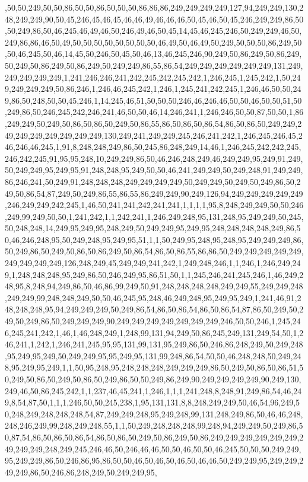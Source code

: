,50,50,249,50,50,86,50,50,86,50,50,50,86,86,86,249,249,249,249,127,94,249,249,130,248,249,249,90,50,45,246,45,46,45,46,46,49,46,46,46,50,45,46,50,45,246,249,249,86,50,50,249,86,50,46,245,46,49,46,50,246,49,46,50,45,14,45,46,245,246,50,249,249,46,50,249,86,86,46,50,49,50,50,50,50,50,50,50,50,46,49,50,46,49,50,249,50,50,50,86,249,50,50,46,245,50,46,14,45,50,246,50,45,50,46,13,46,245,246,90,249,50,86,249,50,86,249,50,249,50,86,249,50,86,249,50,249,249,86,55,86,54,249,249,249,249,249,249,131,249,249,249,249,249,1,241,246,246,241,242,245,242,245,242,1,246,245,1,245,242,1,50,249,249,249,249,50,86,246,1,246,46,245,242,1,246,1,245,241,242,245,1,246,46,50,50,249,86,50,248,50,50,45,246,1,14,245,46,51,50,50,50,246,46,246,46,50,50,46,50,50,51,50,249,86,50,246,245,242,246,241,46,50,50,46,14,246,241,1,246,246,50,50,87,50,50,1,86,249,249,50,249,50,86,50,86,50,249,50,86,55,86,50,86,50,86,54,86,50,86,50,249,249,249,249,249,249,249,249,249,130,249,241,249,249,245,246,241,242,1,246,245,246,45,246,246,46,245,1,91,8,248,248,249,86,50,245,86,248,249,14,46,1,246,245,242,242,245,246,242,245,91,95,95,248,10,249,249,86,50,46,246,248,249,46,249,249,95,249,91,249,50,249,249,95,249,95,91,248,248,95,249,50,50,46,241,249,249,50,249,248,91,249,249,86,246,241,50,249,91,248,248,248,249,249,249,249,50,249,249,50,249,50,249,86,50,249,50,86,54,87,249,50,249,86,55,86,55,86,249,249,90,249,126,94,249,249,249,249,249,246,249,249,242,245,1,46,50,241,241,242,241,241,1,1,1,1,95,8,248,249,249,50,50,246,249,99,249,50,50,1,241,242,1,1,242,241,1,246,249,248,95,131,248,95,249,249,50,245,50,248,248,14,249,95,249,95,248,249,50,249,249,95,249,95,248,248,248,248,249,86,50,46,246,248,95,50,249,248,95,249,95,51,1,1,50,249,95,248,95,248,95,249,249,249,86,50,249,86,50,249,50,86,50,86,249,50,86,54,86,50,86,55,86,86,50,249,249,249,249,249,249,249,249,249,126,248,249,45,249,249,241,242,1,249,248,246,1,1,246,1,246,249,249,1,248,248,248,95,249,86,50,246,249,95,86,51,50,1,1,245,246,241,245,246,1,46,249,248,95,8,248,94,249,86,50,46,86,99,249,50,91,248,248,248,248,249,249,55,249,249,248,249,249,99,248,248,249,50,50,46,245,95,248,46,249,248,95,249,95,249,1,241,46,91,248,248,248,95,94,249,249,249,50,249,86,54,86,50,86,54,86,50,86,54,87,86,50,249,50,249,50,249,86,50,249,249,249,90,249,249,249,249,249,249,249,246,50,50,246,1,245,246,245,241,242,1,46,1,46,248,249,1,248,99,131,94,249,50,86,245,249,131,249,54,50,1,246,241,1,242,1,246,241,245,95,95,131,99,131,95,249,86,50,246,86,248,249,50,249,248,95,249,95,249,50,249,249,95,95,249,95,131,99,248,86,54,50,50,46,248,248,50,249,248,95,249,95,249,1,1,50,95,248,95,248,248,248,249,249,249,86,50,249,50,86,50,86,51,50,249,50,86,50,249,50,86,50,249,86,50,50,249,86,249,90,249,249,249,249,90,249,130,249,46,50,86,245,242,1,1,237,46,45,241,1,246,1,1,1,241,248,8,248,91,249,86,54,46,249,8,54,87,50,1,1,1,246,50,50,245,238,1,95,131,131,8,8,248,249,249,50,46,54,96,249,50,248,249,248,248,248,54,87,249,249,248,95,249,248,99,131,248,249,86,50,46,46,248,248,246,249,99,248,249,248,55,1,1,50,249,248,248,248,99,248,94,249,249,50,249,86,50,87,54,86,50,86,50,86,54,86,50,86,50,249,50,86,249,50,86,249,249,249,249,249,249,249,249,249,248,249,245,246,46,50,246,46,46,50,50,46,50,50,46,245,50,50,50,249,249,95,249,249,86,50,246,86,95,86,50,50,46,50,46,50,46,50,46,46,50,249,249,95,249,249,249,249,86,50,246,86,248,249,50,249,249,95,